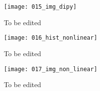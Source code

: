 \documentclass[../structure.tex]{subfiles}
\begin{document}
\begin{figure}[h!]
\centering
\texttt{[image: 015\_img\_dipy]}
\captionsetup{justification=centering}
\caption{To be edited}
\end{figure}

\begin{figure}[h!]
\centering
\texttt{[image: 016\_hist\_nonlinear]}
\captionsetup{justification=centering}
\caption{To be edited}
\end{figure}

\begin{figure}[h!]
\centering
\texttt{[image: 017\_img\_non\_linear]}
\captionsetup{justification=centering}
\caption{To be edited}
\end{figure}
\end{document}
